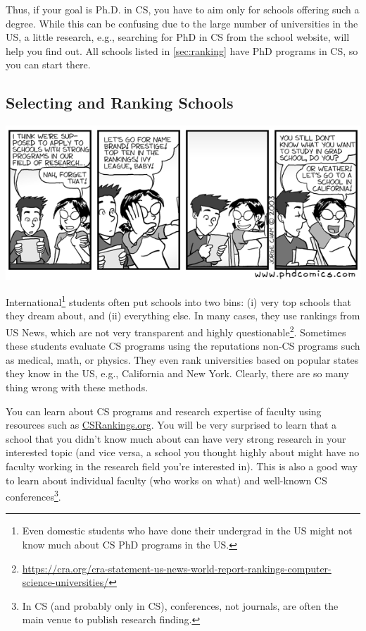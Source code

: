 \documentclass[oneside,11pt]{book}
\begin{document}
Thus, if your goal is Ph.D. in CS, you have to aim only for schools offering such a degree.  %
While this can be confusing due to the large number of universities in the US, a little research, e.g., searching for PhD in CS from the school website, will help you find out. All schools listed in \autoref{sec:ranking} have PhD programs in CS, so you can start there.


\subsection{Selecting and Ranking Schools}\label{sec:selecting-ranking-schools}
\begin{center}
  \includegraphics[scale=0.5]{files/c1.png}
\end{center}

International\footnote{Even domestic students who have done their undergrad in the US might not know much about CS PhD programs in the US.} students often put schools into two bins: (i) very top schools that they dream about, and (ii) everything else.  In many cases, they use rankings from US News, which are not very transparent and highly questionable\footnote{\url{https://cra.org/cra-statement-us-news-world-report-rankings-computer-science-universities/}}.  Sometimes these students evaluate CS programs using the reputations non-CS programs such as medical, math, or physics.
They even rank universities based on popular states they know in the US, e.g., California and New York.  Clearly, there are so many thing wrong with these methods. 

You can learn about CS programs and research expertise of faculty using resources such as \href{https://csrankings.org}{CSRankings.org}. You will be very surprised to learn that a school that you didn't know much about can have very strong research in your interested topic (and vice versa, a school you thought highly about might have no faculty working in the research field you're interested in). This is also a good way to learn about individual faculty (who works on what) and well-known CS conferences\footnote{In CS (and probably only in CS), conferences, not journals, are often the main venue to publish research finding.}. %
\end{document}
